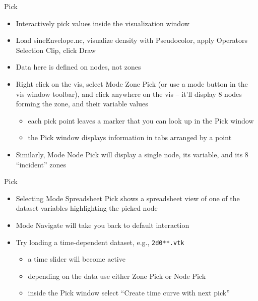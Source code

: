 \begin{frame}{Pick}
  \begin{itemize}\setlength{\itemsep}{3mm}
  \item Interactively pick values inside the visualization window
  \item Load sineEnvelope.nc, visualize density with Pseudocolor, apply Operators \ra Selection \ra Clip,
    click Draw
  \item Data here is defined on nodes, not zones
    \pause
  \item Right click on the vis, select Mode \ra Zone Pick (or use a mode button in the vis window
    toolbar), and click anywhere on the vis -- it'll display 8 nodes forming the zone, and their variable
    values
    \begin{itemize}\setlength{\itemsep}{0mm}
    \item each pick point leaves a marker that you can look up in the Pick window
    \item the Pick window displays information in tabs arranged by a point
    \end{itemize}
    \pause
  \item Similarly, Mode \ra Node Pick will display a single node, its variable, and its 8 ``incident''
    zones
  \end{itemize}
\end{frame}

\begin{frame}{Pick}
  \begin{itemize}\setlength{\itemsep}{3mm}
  \item Selecting Mode \ra Spreadsheet Pick shows a spreadsheet view of one of the dataset variables
    highlighting the picked node
    \pause
  \item Mode \ra Navigate will take you back to default interaction
    \pause
  \item Try loading a time-dependent dataset, e.g., \texttt{2d0**.vtk}
    \begin{itemize}\setlength{\itemsep}{0mm}
    \item a time slider will become active
    \item depending on the data use either Zone Pick or Node Pick
    \item inside the Pick window select ``Create time curve with next pick''
    \end{itemize}
  \end{itemize}
\end{frame}

